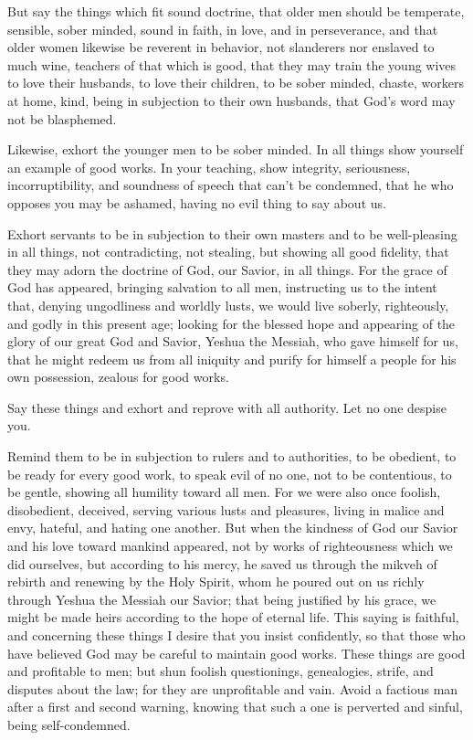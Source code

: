 \mychapter{} \myverse*{}But say the things which fit sound doctrine,
\myverse{}that older men should be temperate, sensible, sober minded, sound in faith,
in love, and in perseverance,
\myverse{}and that older women likewise be reverent in behavior, not slanderers nor enslaved
to much wine, teachers of that which is good,
\myverse{}that they may train the young wives to love their husbands, to love their children,
\myverse{}to be sober minded, chaste, workers at home, kind, being in subjection to their
own husbands, that God’s word may not be blasphemed.

\myverse{}Likewise, exhort the younger men to be sober minded.
\myverse{}In all things show yourself an example of good works. In your teaching, show
integrity, seriousness, incorruptibility,
\myverse{}and soundness of speech that can’t be condemned, that he who opposes you may
be ashamed, having no evil thing to say about us.

\myverse{}Exhort servants to be in subjection to their own masters and to
be well-pleasing in all things, not contradicting,
\myverse{}not stealing, but showing all good fidelity, that they may adorn the doctrine
of God, our Savior, in all things.
\myverse{}For the grace of God has appeared, bringing salvation to all men,
\myverse{}instructing us to the intent that, denying ungodliness and worldly lusts,
we would live soberly, righteously, and godly in this present age;
\myverse{}looking for the blessed hope and appearing of the glory of our great God and
Savior, Yeshua the Messiah,
\myverse{}who gave himself for us, that he might redeem us from all iniquity and purify
for himself a people for his own possession, zealous for good works.

\myverse{}Say these things and exhort and reprove with all authority. Let
no one despise you.


\mychapter{} \myverse*{}Remind them to be in subjection to rulers and to authorities, to
be obedient, to be ready for every good work,
\myverse{}to speak evil of no one, not to be contentious, to be gentle, showing all humility
toward all men.
\myverse{}For we were also once foolish, disobedient, deceived, serving various lusts
and pleasures, living in malice and envy, hateful, and hating one another.
\myverse{}But when the kindness of God our Savior and his love toward mankind appeared,
\myverse{}not by works of righteousness which we did ourselves, but according to his mercy,
he saved us through the mikveh of rebirth and renewing by the Holy Spirit,
\myverse{}whom he poured out on us richly through Yeshua the Messiah our Savior;
\myverse{}that being justified by his grace, we might be made heirs according to the hope
of eternal life.
\myverse{}This saying is faithful, and concerning these things I desire that you insist
confidently, so that those who have believed God may be careful to maintain good works. These things are
good and profitable to men;
\myverse{}but shun foolish questionings, genealogies, strife, and disputes about the law;
for they are unprofitable and vain.
\myverse{}Avoid a factious man after a first and second warning,
\myverse{}knowing that such a one is perverted and sinful, being self-condemned.

